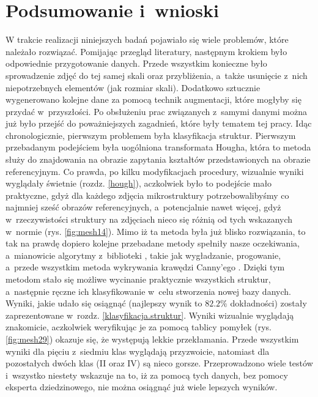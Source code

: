 \chapter{Podsumowanie i~wnioski}
\label{podsumowanie.wnioski}

W trakcie realizacji niniejszych badań pojawiało się wiele problemów, które należało rozwiązać. Pomijając przegląd literatury, następnym krokiem było odpowiednie przygotowanie danych. Przede wszystkim konieczne było sprowadzenie zdjęć do tej samej skali oraz przybliżenia, a~także usunięcie z~nich niepotrzebnych elementów (jak rozmiar skali). Dodatkowo sztucznie wygenerowano kolejne dane za pomocą technik augmentacji, które mogłyby się przydać w~przyszłości. Po obsłużeniu prac związanych z~samymi danymi można już było przejść do poważniejszych zagadnień, które były tematem tej pracy. Idąc chronologicznie, pierwszym problemem była klasyfikacja struktur. Pierwszym przebadanym podejściem była uogólniona transformata Hougha, która to metoda służy do znajdowania na obrazie zapytania kształtów przedstawionych na obrazie referencyjnym. Co prawda, po kilku modyfikacjach procedury, wizualnie wyniki wyglądały świetnie (rozdz. \ref{hough}), aczkolwiek było to podejście mało praktyczne, gdyż dla każdego zdjęcia mikrostruktury potrzebowalibyśmy co najmniej sześć obrazów referencyjnych, a~potencjalnie nawet więcej, gdyż w~rzeczywistości struktury na zdjęciach nieco się różnią od tych wskazanych w~normie (rys. \ref{fig:mesh14}). 
Mimo iż ta metoda była już blisko rozwiązania, to tak na prawdę dopiero kolejne przebadane metody spełniły nasze oczekiwania, a~mianowicie algorytmy z~biblioteki \href{https://opencv.org/}{}, takie jak wygładzanie, progowanie, a~przede wszystkim metoda wykrywania krawędzi Canny'ego \cite{Canny86}. Dzięki tym metodom stało się możliwe wycinanie praktycznie wszystkich struktur, a~następnie ręczne ich klasyfikowanie w~celu stworzenia nowej bazy danych. Wyniki, jakie udało się osiągnąć (najlepszy wynik to $82.2\%$ dokładności) zostały zaprezentowane w~rozdz. \ref{klasyfikacja.struktur}. Wyniki wizualnie wyglądają znakomicie, aczkolwiek weryfikując je za pomocą tablicy pomyłek (rys. \ref{fig:mesh29}) okazuje się, że występują lekkie przekłamania. Przede wszystkim wyniki dla pięciu z~siedmiu klas wyglądają przyzwoicie, natomiast dla pozostałych dwóch klas (II oraz IV) są nieco gorsze. Przeprowadzono wiele testów i~wszystko niestety wskazuje na to, iż za pomocą tych danych, bez pomocy eksperta dziedzinowego, nie można osiągnąć już wiele lepszych wyników.

